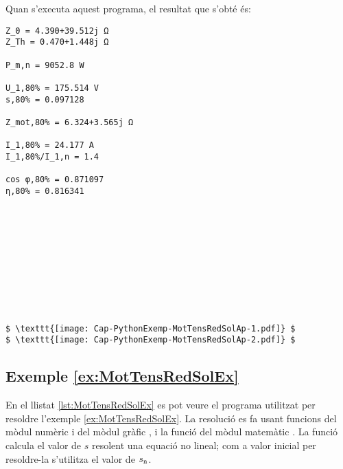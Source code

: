 Quan s'executa aquest programa, el resultat que s'obté és:
\lstset{
	language=,
	numbers=none,
	frame=none
}
\begin{lstlisting}[mathescape=true]
Z_0 = 4.390+39.512j Ω
Z_Th = 0.470+1.448j Ω

P_m,n = 9052.8 W

U_1,80% = 175.514 V
s,80% = 0.097128

Z_mot,80% = 6.324+3.565j Ω

I_1,80% = 24.177 A
I_1,80%/I_1,n = 1.4

cos φ,80% = 0.871097
η,80% = 0.816341

	
	
	
	
	
	
	
	
	
	
$ \texttt{[image: Cap-PythonExemp-MotTensRedSolAp-1.pdf]} $
$ \texttt{[image: Cap-PythonExemp-MotTensRedSolAp-2.pdf]} $
\end{lstlisting} 



\hypertarget{exemple:MotTensRedSolEx}{\subsection{Exemple \ref*{ex:MotTensRedSolEx} \MotTensRedSolEx}}
En el llistat \vref{lst:MotTensRedSolEx} es pot veure el programa utilitzat per resoldre l'exemple \vref{ex:MotTensRedSolEx}. La resolució es fa usant funcions del mòdul numèric  i del mòdul gràfic , i la funció  del mòdul matemàtic . La funció  calcula el valor de $s$ resolent una equació no lineal; com a valor inicial per resoldre-la  s'utilitza el valor de $s_\mathrm{n}$.


